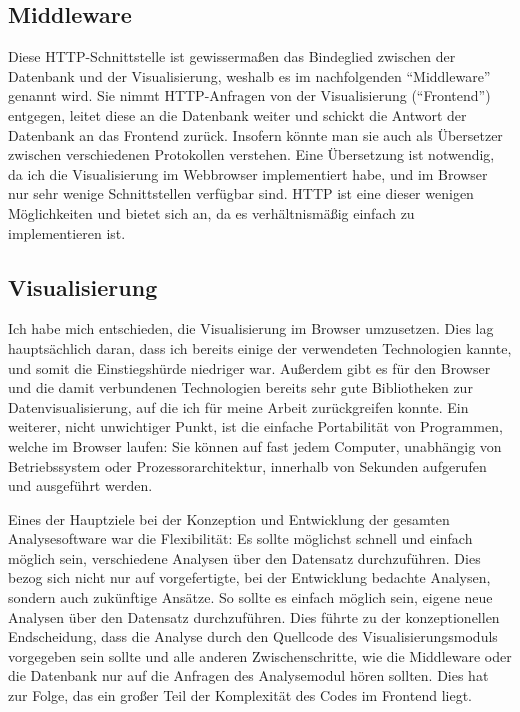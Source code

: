 \documentclass[12pt,ngerman,a4paperpaper,]{paper}
\begin{document}
\subsection{Middleware}\label{middleware}

Diese HTTP-Schnittstelle ist gewissermaßen das Bindeglied zwischen der
Datenbank und der Visualisierung, weshalb es im nachfolgenden
``Middleware'' genannt wird. Sie nimmt HTTP-Anfragen von der
Visualisierung (``Frontend'') entgegen, leitet diese an die Datenbank
weiter und schickt die Antwort der Datenbank an das Frontend zurück.
Insofern könnte man sie auch als Übersetzer zwischen verschiedenen
Protokollen verstehen. Eine Übersetzung ist notwendig, da ich die
Visualisierung im Webbrowser implementiert habe, und im Browser nur sehr
wenige Schnittstellen verfügbar sind. HTTP ist eine dieser wenigen
Möglichkeiten und bietet sich an, da es verhältnismäßig einfach zu
implementieren ist.

\subsection{Visualisierung}\label{visualisierung}

Ich habe mich entschieden, die Visualisierung im Browser umzusetzen.
Dies lag hauptsächlich daran, dass ich bereits einige der verwendeten
Technologien kannte, und somit die Einstiegshürde niedriger war.
Außerdem gibt es für den Browser und die damit verbundenen Technologien
bereits sehr gute Bibliotheken zur Datenvisualisierung, auf die ich für
meine Arbeit zurückgreifen konnte. Ein weiterer, nicht unwichtiger
Punkt, ist die einfache Portabilität von Programmen, welche im Browser
laufen: Sie können auf fast jedem Computer, unabhängig von
Betriebssystem oder Prozessorarchitektur, innerhalb von Sekunden
aufgerufen und ausgeführt werden.

Eines der Hauptziele bei der Konzeption und Entwicklung der gesamten
Analysesoftware war die Flexibilität: Es sollte möglichst schnell und
einfach möglich sein, verschiedene Analysen über den Datensatz
durchzuführen. Dies bezog sich nicht nur auf vorgefertigte, bei der
Entwicklung bedachte Analysen, sondern auch zukünftige Ansätze. So
sollte es einfach möglich sein, eigene neue Analysen über den Datensatz
durchzuführen. Dies führte zu der konzeptionellen Endscheidung, dass die
Analyse durch den Quellcode des Visualisierungsmoduls vorgegeben sein
sollte und alle anderen Zwischenschritte, wie die Middleware oder die
Datenbank nur auf die Anfragen des Analysemodul hören sollten. Dies hat
zur Folge, das ein großer Teil der Komplexität des Codes im Frontend
liegt.
\end{document}

